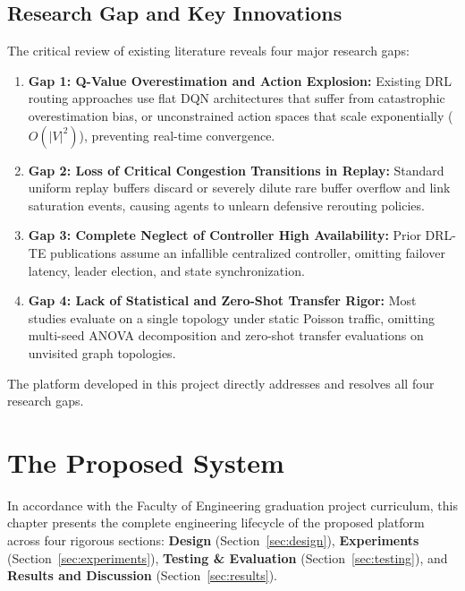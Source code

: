 \documentclass[12pt,a4paper,oneside]{report}
\begin{document}
\section{Research Gap and Key Innovations}
The critical review of existing literature reveals four major research gaps:
\begin{enumerate}
    \item \textbf{Gap 1: Q-Value Overestimation and Action Explosion:} Existing DRL routing approaches use flat DQN architectures that suffer from catastrophic overestimation bias, or unconstrained action spaces that scale exponentially ($O(|V|^2)$), preventing real-time convergence.
    \item \textbf{Gap 2: Loss of Critical Congestion Transitions in Replay:} Standard uniform replay buffers discard or severely dilute rare buffer overflow and link saturation events, causing agents to unlearn defensive rerouting policies.
    \item \textbf{Gap 3: Complete Neglect of Controller High Availability:} Prior DRL-TE publications assume an infallible centralized controller, omitting failover latency, leader election, and state synchronization.
    \item \textbf{Gap 4: Lack of Statistical and Zero-Shot Transfer Rigor:} Most studies evaluate on a single topology under static Poisson traffic, omitting multi-seed ANOVA decomposition and zero-shot transfer evaluations on unvisited graph topologies.
\end{enumerate}

The platform developed in this project directly addresses and resolves all four research gaps.

\chapter{The Proposed System}
\label{chap:project}

In accordance with the Faculty of Engineering graduation project curriculum, this chapter presents the complete engineering lifecycle of the proposed platform across four rigorous sections: \textbf{Design} (Section~\ref{sec:design}), \textbf{Experiments} (Section~\ref{sec:experiments}), \textbf{Testing \& Evaluation} (Section~\ref{sec:testing}), and \textbf{Results and Discussion} (Section~\ref{sec:results}).
\end{document}
